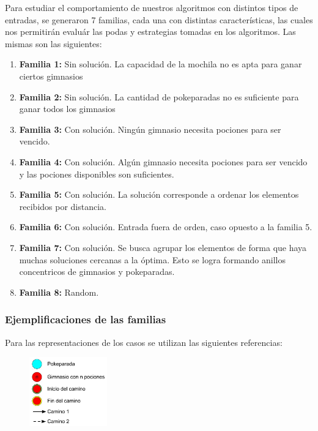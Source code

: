 \indent Para estudiar el comportamiento de nuestros algoritmos con distintos tipos de entradas, se generaron 7 familias, cada una con distintas caracter\'isticas, las cuales nos permitirán evaluár las  podas y estrategias tomadas en los algoritmos. Las mismas son las siguientes:

\begin{enumerate}
\item {\bf Familia 1:}  Sin solución. La capacidad de la mochila no es apta para ganar ciertos gimnasios
\item {\bf Familia 2:} Sin soluci\'on. La cantidad de pokeparadas no es suficiente para ganar todos los gimnasios
\item {\bf Familia 3:} Con solución. Ning\'un gimnasio necesita pociones para ser vencido.
\item {\bf Familia 4:} Con solución. Algún gimnasio necesita pociones para ser vencido y las pociones disponibles son suficientes.
\item {\bf Familia 5:} Con solución. La solución corresponde a ordenar los elementos recibidos por distancia.
\item {\bf Familia 6:} Con solución. Entrada fuera de orden, caso opuesto a la familia 5.
\item {\bf Familia 7:} Con solución. Se busca agrupar los elementos de forma que haya muchas soluciones cercanas a la óptima. Esto se logra formando anillos concentricos de gimnasios y pokeparadas.
\item {\bf Familia 8:} Random.
\end{enumerate}


 \subsubsection*{Ejemplificaciones de las familias}
 
Para las representaciones de los casos se utilizan las siguientes referencias:
\begin{figure} [!ht]
\center
 \includegraphics[width=0.30\textwidth]{./EJ1/referencias.jpeg}
\end{figure}
 
